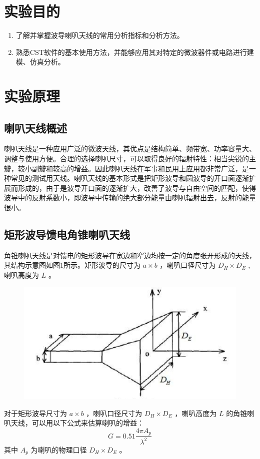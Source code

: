 \documentclass{source/Report}
\title{}
\date{2023年3月30日}
\begin{document}
\makecover
\makeheader
\section{实验目的}
\begin{enumerate}[label={\arabic*.}]
    \item 了解并掌握波导喇叭天线的常用分析指标和分析方法。
    \item 熟悉CST软件的基本使用方法，并能够应用其对特定的微波器件或电路进行建模、仿真分析。
\end{enumerate}

\section{实验原理}
\subsection{喇叭天线概述}
喇叭天线是一种应用广泛的微波天线，其优点是结构简单、频带宽、功率容量大、调整与使用方便。合理的选择喇叭尺寸，可以取得良好的辐射特性：相当尖锐的主瓣，较小副瓣和较高的增益。因此喇叭天线在军事和民用上应用都非常广泛，是一种常见的测试用天线。喇叭天线的基本形式是把矩形波导和圆波导的开口面逐渐扩展而形成的，由于是波导开口面的逐渐扩大，改善了波导与自由空间的匹配，使得波导中的反射系数小，即波导中传输的绝大部分能量由喇叭辐射出去，反射的能量很小。
\subsection{矩形波导馈电角锥喇叭天线}
角锥喇叭天线是对馈电的矩形波导在宽边和窄边均按一定的角度张开形成的天线，其结构示意图如图1所示。矩形波导的尺寸为 $a\times b$ ，喇叭口径尺寸为 $D_H\times D_E$ ,喇叭高度为 $L$ 。
\begin{figure}[H]
    \begin{center}
        \includegraphics[width=0.4\linewidth]{pic/cb2_p1.png}
        \caption{}
    \end{center}
\end{figure}
对于矩形波导尺寸为 $a\times b$ ，喇叭口径尺寸为 $D_H\times D_E$ ，喇叭高度为 $L$ 的角锥喇叭天线，可以用以下公式来估算喇叭的增益：
$$G=0.51\dfrac{4\pi A_p}{\lambda^2}$$
其中 $A_p$ 为喇叭的物理口径 $D_H\times D_E$ 。
\end{document}
